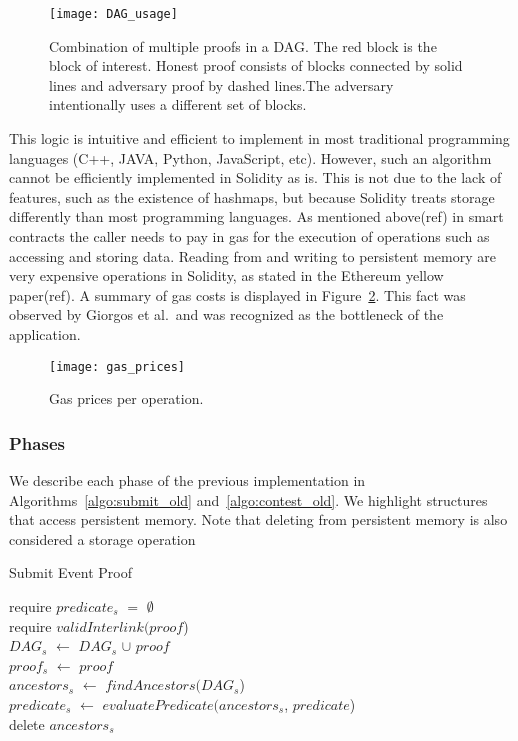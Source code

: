 \begin{figure}[hbt]
    \centering
    \texttt{[image: DAG\_usage]}
    \caption{Combination of multiple proofs in a DAG. The red block is the
        block of interest. Honest proof consists of blocks connected by solid
        lines and adversary proof by dashed lines.The adversary intentionally
        uses a different set of blocks.}
    \label{fig:DAG_usage}
\end{figure}

This logic is intuitive and efficient to implement in most traditional
programming languages (C++, JAVA, Python, JavaScript, etc). However, such an
algorithm cannot be efficiently implemented in Solidity as is. This is not
due to the lack of features, such as the existence of hashmaps, but because
Solidity treats storage differently than most programming languages. As
mentioned above(ref) in smart contracts the caller needs to pay in gas for the
execution of operations such as accessing and storing data. Reading from and
writing to persistent memory are very expensive operations in Solidity, as
stated in the Ethereum yellow paper(ref). A summary of gas costs is displayed
in Figure~\ref{fig:gas_prices}. This fact was observed by Giorgos et al.\ and
was recognized as the bottleneck of the application.

\begin{figure}[hbt]
    \centering
    \texttt{[image: gas\_prices]}
    \caption{Gas prices per operation.}
    \label{fig:gas_prices}
\end{figure}

\subsubsection{Phases}

We describe each phase of the previous implementation in
Algorithms~\ref{algo:submit_old} and~\ref{algo:contest_old}. We highlight
structures that access persistent memory. Note that deleting from persistent
memory is also considered a storage operation

\begin{algorithm}
    \caption{Submit Event Proof}
    \label{algo:submit_old}
    require $predicate_{s}$ $=$ $\emptyset$ \\
    require $validInterlink(proof$) \\
    $DAG_{s}$ $\leftarrow$ $DAG_{s}$ $\cup$ $proof$\\
    $proof_{s}$ $\leftarrow$ $proof$\\
    $ancestors_{s}$ $\leftarrow$ $findAncestors(DAG_{s}$)\\
    $predicate_{s}$ $\leftarrow$ $evaluatePredicate(ancestors_{s}$,
    $predicate$)\\
    delete $ancestors_{s}$\\
\end{algorithm}


